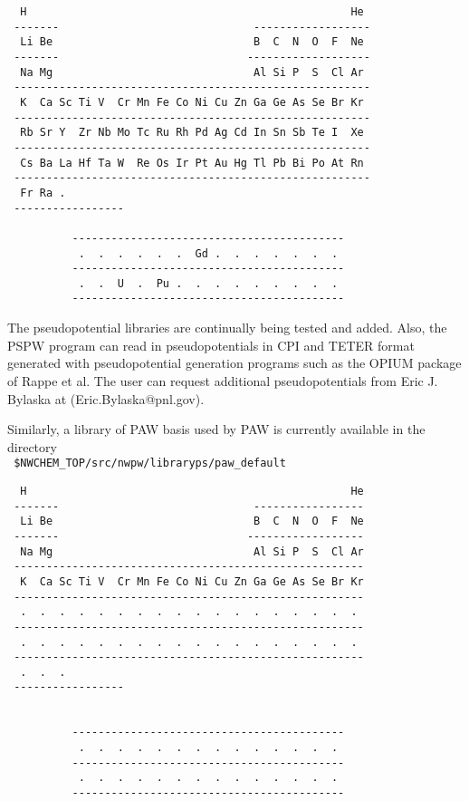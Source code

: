 \begin{verbatim}
  H                                                  He
 -------                              ------------------
  Li Be                               B  C  N  O  F  Ne
 -------                             -------------------
  Na Mg                               Al Si P  S  Cl Ar
 -------------------------------------------------------
  K  Ca Sc Ti V  Cr Mn Fe Co Ni Cu Zn Ga Ge As Se Br Kr         
 -------------------------------------------------------
  Rb Sr Y  Zr Nb Mo Tc Ru Rh Pd Ag Cd In Sn Sb Te I  Xe
 -------------------------------------------------------
  Cs Ba La Hf Ta W  Re Os Ir Pt Au Hg Tl Pb Bi Po At Rn
 -------------------------------------------------------
  Fr Ra . 
 -----------------

          ------------------------------------------
           .  .  .  .  .  .  Gd .  .  .  .  .  .  .                      
          ------------------------------------------
           .  .  U  .  Pu .  .  .  .  .  .  .  .  .      
          ------------------------------------------

\end{verbatim}
The pseudopotential libraries are continually being tested
and added.   Also,  the PSPW program can read in pseudopotentials
in CPI and TETER format generated with pseudopotential generation
programs such as the OPIUM package of Rappe et al.
The user can request additional pseudopotentials from 
Eric J. Bylaska at (Eric.Bylaska@pnl.gov).  

Similarly, a library of PAW basis used by PAW is currently available in the
directory \\
\verb+ $NWCHEM_TOP/src/nwpw/libraryps/paw_default+

\begin{verbatim}
  H                                                  He
 -------                              -----------------
  Li Be                               B  C  N  O  F  Ne
 -------                             ------------------
  Na Mg                               Al Si P  S  Cl Ar
 ------------------------------------------------------
  K  Ca Sc Ti V  Cr Mn Fe Co Ni Cu Zn Ga Ge As Se Br Kr         
 ------------------------------------------------------
  .  .  .  .  .  .  .  .  .  .  .  .  .  .  .  .  .  .
 ------------------------------------------------------
  .  .  .  .  .  .  .  .  .  .  .  .  .  .  .  .  .  .
 ------------------------------------------------------
  .  .  . 
 -----------------
                                                      

          ------------------------------------------
           .  .  .  .  .  .  .  .  .  .  .  .  .  .                      
          ------------------------------------------
           .  .  .  .  .  .  .  .  .  .  .  .  .  .      
          ------------------------------------------

\end{verbatim}


